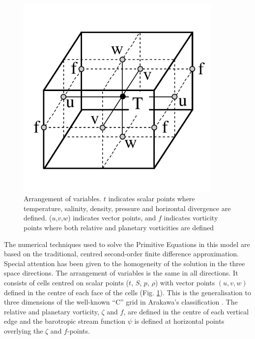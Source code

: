 \begin{figure}[!tb]    \begin{center}
\includegraphics[width=0.90\textwidth]{./TexFiles/Figures/Fig_cell.pdf}
\caption{ \label{Fig_cell}    
Arrangement of variables. $t$ indicates scalar points where temperature, 
salinity, density, pressure and horizontal divergence are defined. ($u$,$v$,$w$) 
indicates vector points, and $f$ indicates vorticity points where both relative and 
planetary vorticities are defined}
\end{center}   \end{figure}

The numerical techniques used to solve the Primitive Equations in this model are 
based on the traditional, centred second-order finite difference approximation. 
Special attention has been given to the homogeneity of the solution in the three 
space directions. The arrangement of variables is the same in all directions. 
It consists of cells centred on scalar points ($t$, $S$, $p$, $\rho$) with vector 
points $(u, v, w)$ defined in the centre of each face of the cells (Fig. \ref{Fig_cell}). 
This is the generalisation to three dimensions of the well-known ``C'' grid in 
Arakawa's classification \citep{Mesinger_Arakawa_Bk76}. The relative and 
planetary vorticity, $\zeta$ and $f$, are defined in the centre of each vertical edge 
and the barotropic stream function $\psi$ is defined at horizontal points overlying 
the $\zeta$ and $f$-points.

